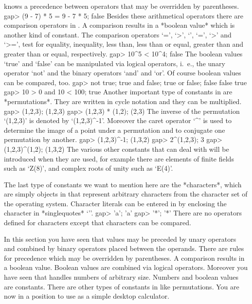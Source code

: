 {\GAP}  knows a  precedence  between operators that may be overridden  by
parentheses.
\beginexample
gap> (9 - 7) * 5 = 9 - 7  * 5;
false 
\endexample
Besides these arithmetical operators there are comparison operators in
{\GAP}. A comparison results  in a  *boolean  value* which is  another
kind  of constant.  The comparison  operators `=', `\<>', `\<', `\<=',
`>' and `>=',  test for equality, inequality,  less than, less than or
equal, greater than and greater than or equal, respectively.
\beginexample
gap> 10^5 < 10^4;
false 
\endexample
The boolean values  `true' and   `false'  can be  manipulated via logical
operators, i.~e., the unary operator `not' and the binary operators `and'
and `or'.  Of course boolean values can be compared, too.
\beginexample
gap> not true; true and false; true or false;
false
false
true
gap> 10 > 0 and 10 < 100;
true 
\endexample
Another important  type of constants in   {\GAP} are *permutations*. They
are written in cycle notation and they can be multiplied.
\beginexample
gap> (1,2,3);
(1,2,3)
gap> (1,2,3) * (1,2);
(2,3) 
\endexample
The inverse of the   permutation  `(1,2,3)' is denoted   by `(1,2,3)^-1'.
Moreover the caret operator `^' is used to determine the image of a point
under a permutation and to conjugate one permutation by another.
\beginexample
gap> (1,2,3)^-1;
(1,3,2)
gap> 2^(1,2,3);
3
gap> (1,2,3)^(1,2);
(1,3,2) 
\endexample
The various other constants that {\GAP} can deal with will be introduced
when they are used, for example there are elements of finite fields
such as `Z(8)', and complex roots of unity such as `E(4)'.

The    last  type  of   constants  we  want  to mention    here are the
*characters*, which are simply objects in {\GAP} that represent arbitrary
characters  from  the character set   of the  operating system. Character
literals can  be  entered   in  {\GAP} by  enclosing  the   character  in
*singlequotes* `{'}'.
\beginexample
gap> 'a';
'a'
gap> '*';
'*' 
\endexample
There are no  operators defined for characters except that characters can
be compared.

In this  section you  have  seen that values  may  be preceded  by  unary
operators  and combined by  binary operators placed between the operands.
There are rules for precedence which may be overridden by parentheses.  A
comparison  results in a boolean value.   Boolean values are combined via
logical operators.  Moreover you have seen that {\GAP} handles numbers of
arbitrary size.   Numbers and boolean   values are constants.   There are
other types of  constants in {\GAP} like permutations.   You are now in a
position to use {\GAP} as a simple desktop calculator.

